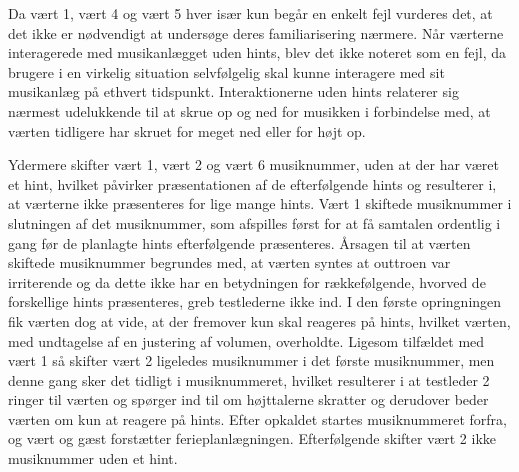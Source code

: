 Da vært 1, vært 4 og vært 5 hver især kun begår en enkelt fejl vurderes det, at det ikke er nødvendigt at undersøge deres familiarisering nærmere.\blankline
%
Når værterne interagerede med musikanlægget uden hints, blev det ikke noteret som en fejl, da brugere i en virkelig situation selvfølgelig skal kunne interagere med sit musikanlæg på ethvert tidspunkt. Interaktionerne uden hints relaterer sig nærmest udelukkende til at skrue op og ned for musikken i forbindelse med, at værten tidligere har skruet for meget ned eller for højt op. 

Ydermere skifter vært 1, vært 2 og vært 6 musiknummer, uden at der har været et hint, hvilket påvirker præsentationen af de efterfølgende hints og resulterer i, at værterne ikke præsenteres for lige mange hints. Vært 1 skiftede musiknummer i slutningen af det musiknummer, som afspilles først for at få samtalen ordentlig i gang før de planlagte hints efterfølgende præsenteres. Årsagen til at værten skiftede musiknummer begrundes med, at værten syntes at outtroen var irriterende og da dette ikke har en betydningen for rækkefølgende, hvorved de forskellige hints præsenteres, greb testlederne ikke ind. I den første opringningen fik værten dog at vide, at der fremover kun skal reageres på hints, hvilket værten, med undtagelse af en justering af volumen, overholdte. Ligesom tilfældet med vært 1 så skifter vært 2 ligeledes musiknummer i det første musiknummer, men denne gang sker det tidligt i musiknummeret, hvilket resulterer i at testleder 2 ringer til værten og spørger ind til om højttalerne skratter og derudover beder værten om kun at reagere på hints. Efter opkaldet startes musiknummeret forfra, og vært og gæst forstætter ferieplanlægningen. Efterfølgende skifter vært 2 ikke musiknummer uden et hint.    


